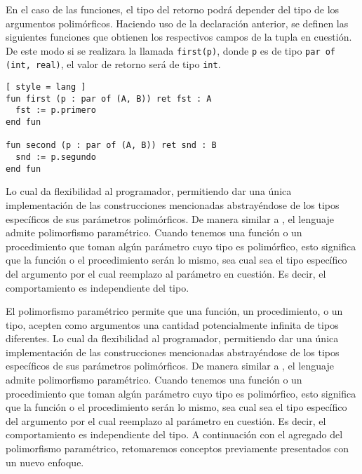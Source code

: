 En el caso de las funciones, el tipo del retorno podrá depender del tipo de los argumentos polimórficos.
Haciendo uso de la declaración anterior, se definen las siguientes funciones que obtienen los respectivos campos de la tupla en cuestión.
De este modo si se realizara la llamada \lstinline[style = lang]{first(p)}, donde \lstinline[style = lang]{p} es de tipo \lstinline[style = lang]{par of (int, real)}, el valor de retorno será de tipo \lstinline[style = lang]{int}.

\begin{lstlisting}[ style = lang ]
fun first (p : par of (A, B)) ret fst : A
  fst := p.primero
end fun

fun second (p : par of (A, B)) ret snd : B
  snd := p.segundo
end fun
\end{lstlisting}
\fi




\iffalse
Lo cual da flexibilidad al programador, permitiendo dar una única implementación de las construcciones mencionadas abstrayéndose de los tipos específicos de sus parámetros polimórficos.
De manera similar a \Haskell{}, el lenguaje admite polimorfismo paramétrico.
Cuando tenemos una función o un procedimiento que toman algún parámetro cuyo tipo es polimórfico, esto significa que la función o el procedimiento serán lo mismo, sea cual sea el tipo específico del argumento por el cual reemplazo al parámetro en cuestión.
Es decir, el comportamiento es independiente del tipo.

El polimorfismo paramétrico permite que una función, un procedimiento, o un tipo, acepten como argumentos una cantidad potencialmente infinita de tipos diferentes.
Lo cual da flexibilidad al programador, permitiendo dar una única implementación de las construcciones mencionadas abstrayéndose de los tipos específicos de sus parámetros polimórficos.
De manera similar a \Haskell{}, el lenguaje admite polimorfismo paramétrico.
Cuando tenemos una función o un procedimiento que toman algún parámetro cuyo tipo es polimórfico, esto significa que la función o el procedimiento serán lo mismo, sea cual sea el tipo específico del argumento por el cual reemplazo al parámetro en cuestión.
Es decir, el comportamiento es independiente del tipo.
A continuación con el agregado del polimorfismo paramétrico, retomaremos conceptos previamente presentados con un nuevo enfoque.

